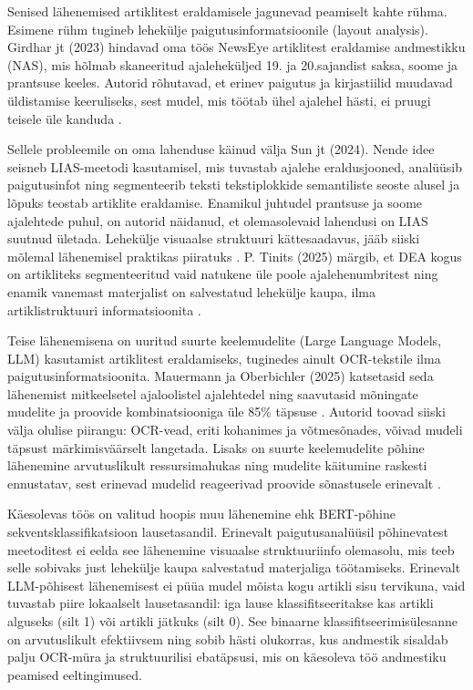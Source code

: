 Senised lähenemised artiklitest eraldamisele jagunevad peamiselt kahte rühma. Esimene rühm tugineb lehekülje paigutusinformatsioonile (layout analysis). Girdhar jt (2023) hindavad oma töös NewsEye artiklitest eraldamise andmestikku (NAS), mis hõlmab skaneeritud ajaleheküljed 19. ja 20.sajandist saksa, soome ja prantsuse keeles. Autorid rõhutavad, et erinev paigutus ja kirjastiilid muudavad üldistamise keeruliseks, sest mudel, mis töötab ühel ajalehel hästi, ei pruugi teisele üle kanduda \cite{girdhar2023}.

Sellele probleemile on oma lahenduse käinud välja Sun jt (2024). Nende idee seisneb LIAS-meetodi kasutamisel, mis tuvastab ajalehe eraldusjooned, analüüsib paigutusinfot ning segmenteerib teksti tekstiplokkide semantiliste seoste alusel ja lõpuks teostab artiklite eraldamise. Enamikul juhtudel prantsuse ja soome ajalehtede puhul, on autorid näidanud, et olemasolevaid lahendusi on LIAS suutnud ületada. Lehekülje visuaalse struktuuri kättesaadavus, jääb siiski mõlemal lähenemisel praktikas piiratuks \cite{sun2024}. P. Tinits (2025) märgib, et DEA kogus on artikliteks segmenteeritud vaid natukene üle poole ajalehenumbritest ning enamik vanemast materjalist on salvestatud lehekülje kaupa, ilma artiklistruktuuri informatsioonita \cite[lk~102--103]{tinits2025}.

Teise lähenemisena on uuritud suurte keelemudelite (Large Language Models, LLM) kasutamist artiklitest eraldamiseks, tuginedes ainult OCR-tekstile ilma paigutusinformatsioonita. Mauermann ja Oberbichler (2025) katsetasid seda lähenemist mitkeelsetel ajaloolistel ajalehtedel ning saavutasid mõningate mudelite ja proovide kombinatsiooniga üle 85\% täpsuse \cite{mauermann2025}. Autorid toovad siiski välja olulise piirangu: OCR-vead, eriti kohanimes ja võtmesõnades, võivad mudeli täpsust märkimisväärselt langetada. Lisaks on suurte keelemudelite põhine lähenemine arvutuslikult ressursimahukas ning mudelite käitumine raskesti ennustatav, sest erinevad mudelid reageerivad proovide sõnastusele erinevalt \cite{mauermann2025}.

Käesolevas töös on valitud hoopis muu lähenemine ehk BERT-põhine sekventsklassifikatsioon lausetasandil. Erinevalt paigutusanalüüsil põhinevatest meetoditest ei eelda see lähenemine visuaalse struktuuriinfo olemasolu, mis teeb selle sobivaks just lehekülje kaupa salvestatud materjaliga töötamiseks. Erinevalt LLM-põhisest lähenemisest ei püüa mudel mõista kogu artikli sisu tervikuna, vaid tuvastab piire lokaalselt lausetasandil: iga lause klassifitseeritakse kas artikli alguseks (silt 1) või artikli jätkuks (silt 0). See binaarne klassifitseerimisülesanne on arvutuslikult efektiivsem ning sobib hästi olukorras, kus andmestik sisaldab palju OCR-müra ja struktuurilisi ebatäpsusi, mis on käesoleva töö andmestiku peamised eeltingimused.

